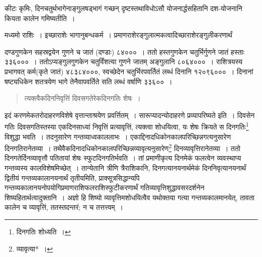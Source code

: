 \documentclass[10pt, openany]{book}
\begin{document}
{{कीटः कृमिः, दिनचतुर्थभागेनाङ्गुलषड्भागं गच्छन् दृष्टस्तथाविधोऽसौ
योजनार्द्धसहितानि दश-योजनानि कियता कालेन गमिष्यतीति~।}

{मध्यमो राशिः~। इच्छाराशेः भागानुबन्धकर्म~।
प्रमाणराशेरङ्गुलात्मकत्वादिच्छाराशेरङ्गुलीकरणार्थं}

\newpage

{दण्डगुणकेन सहस्रद्वयेन गुणने च जातं (दण्डाः) ८४०००~। ततो हस्तगुणकेन
चतुर्भिर्गुणने} 
{जातं हस्ताः ३३६०००~। ततोऽप्यङ्गुलगुणकेन चतुर्विंशत्या गुणने जातम्
अङ्गुलानि}
{८०६४०००~। राशित्रयस्य प्रभागवत् कर्म(कृते जातं) ४८३८४०००, स्वच्छेदेन}
{चतुर्भिरपवर्तितं लब्धं दिनानि १२०९६०००~। दिनानां षष्ट्यधिकेन शतत्रयेण
भागे}
{तेनैवापवर्तिते सति लब्धं वर्षाणि ३३६००~।}

\vspace{0.3cm}{गतिनिवृत्तौ करणसूत्रमार्यायाः पूर्वार्धम्\textemdash}

\begin{quote}
    
{\bs त्यक्त्वैकदिननिवृत्तिं दिवसगतेरेकदिनगतिः शेषः~।}\end{quote}

{इदं करणमेकतरोदाहरणविशेषे वृत्तान्ताश्रयेण प्रवर्त्तितम्~।
सारूप्यादन्योदाहरणे}
{प्रव्यापरिष्यते इति~। दिवसेन गतिः दिवसगतिस्तस्या एकदिनसाध्यां निवृत्तिं
प्रत्यावृत्तिं, त्यक्त्वा} 
{शोधयित्वा, यः शेषः क्रियते स दिनगतिः\renewcommand{\thefootnote}{\s २}\footnote{\s दिनगतिः शोध्यति~।}  विशुद्धा भवति~। तदनुसारेण गन्तव्याध्वकाललाभः~। एकाद्दिनादधिकोनकालपरिच्छिन्नगत्यनुसारेण दिनगतिरानेतव्या~। तथैवैकदिनादधिकोनकालपरिच्छिन्नव्यावृत्यनुसारेण\renewcommand{\thefootnote}{\s ३}\footnote{\s *व्यावृत्या*~।}  दिनव्यावृत्तिरानेतव्या~। ततो
दिनगतेर्दिनव्यावृत्तौ पतितायां}
{शेषः स्फुटदिनगतिर्भवति~। तां प्रमाणीकृत्य दिनमेकं फलत्वेन व्यवस्थाप्य
गन्तव्यस्य}
{कालविशेषमिच्छेत्~। तान्येतानि त्रीणि त्रैराशिकानि, दिनगत्यानयनार्थमेकं
दिननिवृत्यानयनार्थं}
{द्वितीयं गन्तव्यकालानयनार्थं तृतीयमिति, प्राक्सूत्रसिद्धान्यपि
गन्तव्यकालानयनोपयोगिप्रमाणराशिफलराशिस्फुटीकरणार्थं गतिव्यावृत्तिशुद्धावसरदर्शनेन
शिष्यहितार्थत्वादुक्तानि~।}
{अज्ञो हि शिष्यो व्यावृत्तिमशोधयित्वैव यथोक्तया गत्या गन्तव्यकालमानयेत्,
तावता}
{कालेन च व्यावृत्तिं, ततस्तदन्तरं; न च तत्तत्त्वम्~।}

}
\end{document}
